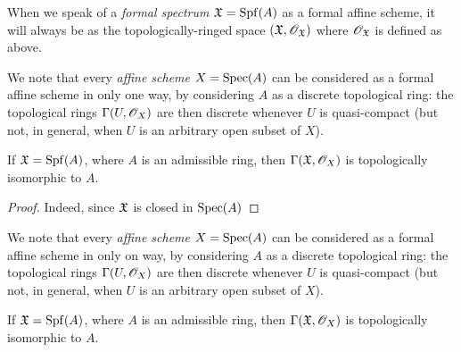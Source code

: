 When we speak of a {\em formal spectrum $\mathfrak{X}={\mathop{\mathrm{Spf}}\nolimits}(A)$} as a formal affine scheme, it will always be as the topologically-ringed space $(\mathfrak{X},\mathscr{O}_\mathfrak{X})$ where $\mathscr{O}_\mathfrak{X}$ is defined as above.

We note that every \emph{affine scheme} $X={\mathop{\mathrm{Spec}}\nolimits}(A)$ can be considered as a formal affine scheme in only one way, by considering $A$ as a discrete topological ring: the topological rings $\Gamma(U,\mathscr{O}_X)$ are then discrete whenever $U$ is quasi-compact (but not, in general, when $U$ is an arbitrary open subset of $X$).

\begin{prop}[10.1.3]
\label{1.10.1.3}
If $\mathfrak{X}={\mathop{\mathrm{Spf}}\nolimits}(A)$, where $A$ is an admissible ring, then $\Gamma(\mathfrak{X},\mathscr{O}_X)$ is topologically isomorphic to $A$.
\end{prop}

\begin{proof}
\label{proof-1.10.1.3}
Indeed, since $\mathfrak{X}$ is closed in ${\mathop{\mathrm{Spec}}\nolimits}(A)$
\end{proof}

We note that every \emph{affine scheme} $X={\mathop{\mathrm{Spec}}\nolimits}(A)$ can be considered as a formal affine scheme in only on way, by considering $A$ as a discrete topological ring: the topological rings $\Gamma(U,\mathscr{O}_X)$ are then discrete whenever $U$ is quasi-compact (but not, in general, when $U$ is an arbitrary open subset of $X$).

\begin{prop}[10.1.3]
\label{1.10.1.3}
If $\mathfrak{X}={\mathop{\mathrm{Spf}}\nolimits}(A)$, where $A$ is an admissible ring, then $\Gamma(\mathfrak{X},\mathscr{O}_X)$ is topologically isomorphic to $A$.
\end{prop}
